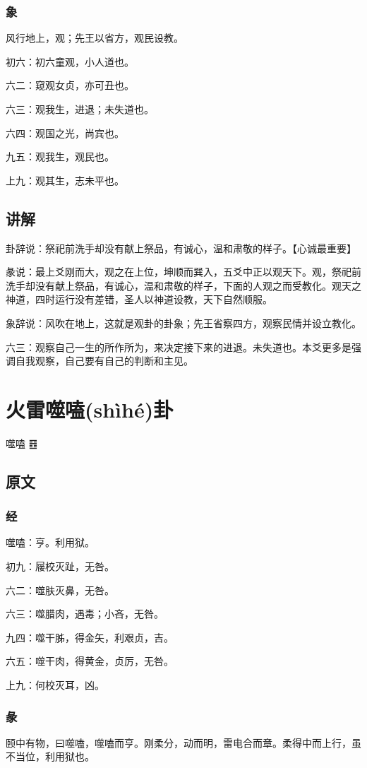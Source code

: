 \documentclass[12pt,oneside]{book}
\begin{document}
\subsection{象}
风行地上，观；先王以省方，观民设教。

初六：初六童观，小人道也。

六二：窥观女贞，亦可丑也。

六三：观我生，进退；未失道也。

六四：观国之光，尚宾也。

九五：观我生，观民也。

上九：观其生，志未平也。

\section{讲解}
卦辞说：祭祀前洗手却没有献上祭品，有诚心，温和肃敬的样子。【心诚最重要】

彖说：最上爻刚而大，观之在上位，坤顺而巽入，五爻中正以观天下。观，祭祀前洗手却没有献上祭品，有诚心，温和肃敬的样子，下面的人观之而受教化。观天之神道，四时运行没有差错，圣人以神道设教，天下自然顺服。

象辞说：风吹在地上，这就是观卦的卦象；先王省察四方，观察民情并设立教化。

六三：观察自己一生的所作所为，来决定接下来的进退。未失道也。本爻更多是强调自我观察，自己要有自己的判断和主见。

\chapter{火雷噬嗑(shìhé)卦}
噬嗑 {\Large ䷔}

\section{原文}

\subsection{经}
噬嗑：亨。利用狱。

初九：屦校灭趾，无咎。

六二：噬肤灭鼻，无咎。

六三：噬腊肉，遇毒；小吝，无咎。

九四：噬干胏，得金矢，利艰贞，吉。

六五：噬干肉，得黄金，贞厉，无咎。

上九：何校灭耳，凶。

\subsection{彖}
颐中有物，曰噬嗑，噬嗑而亨。刚柔分，动而明，雷电合而章。柔得中而上行，虽不当位，利用狱也。
\end{document}
